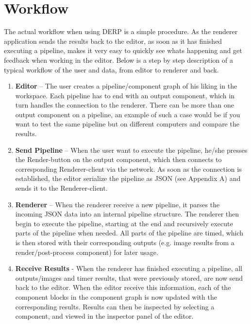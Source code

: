 \section{Workflow}
The actual workflow when using DERP is a simple procedure. As the renderer application sends the results back to the editor, as soon as it has finished executing a pipeline, makes it very easy to quickly see whats happening and get feedback when working in the editor. Below is a step by step description of a typical workflow of the user and data, from editor to renderer and back.



\begin{enumerate}
  \item \textbf{Editor} -- The user creates a pipeline/component graph of his liking in the workspace. Each pipeline has to end with an output component, which in turn handles the connection to the renderer. There can be more than one output component on a pipeline, an example of such a case would be if you want to test the same pipeline but on different computers and compare the results.
  \item \textbf{Send Pipeline} -- When the user want to execute the pipeline, he/she presses the Render-button on the output component, which then connects to corresponding Renderer-client via the network. As soon as the connection is established, the editor serialize the pipeline as JSON (see Appendix A) and sends it to the Renderer-client.
  \item \textbf{Renderer} -- When the renderer receive a new pipeline, it parses the incoming JSON data into an internal pipeline structure. The renderer then begin to execute the pipeline, starting at the end and recursively execute parts of the pipeline when needed. All parts of the pipeline are timed, which is then stored with their corresponding outputs (e.g. image results from a render/post-process component) for later usage.
  \item \textbf{Receive Results} - When the renderer has finished executing a pipeline, all outputs/images and timer results, that were previously stored, are now send back to the editor. When the editor receive this information, each of the component blocks in the component graph is now updated with the corresponding results. Results can then be inspected by selecting a component, and viewed in the inspector panel of the editor.
\end{enumerate}

